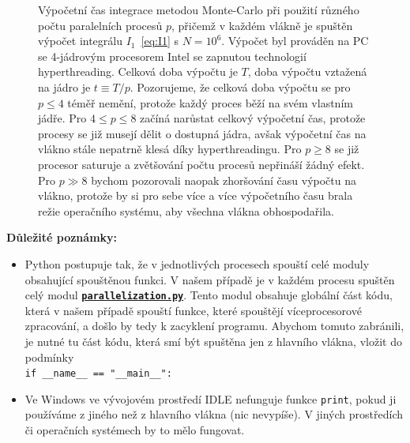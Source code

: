 \documentclass[a4paper,11pt,twoside]{article}
\def\code#1{\textnormal{\texttt{#1}}}
\def\ghfile#1#2{\textnormal{\textbf{\texttt{\href{https://github.com/PavelStransky/PCInPhysics/blob/main/#1#2}{#2}}}}}
\theoremstyle{red}
\theoremstyle{green}
\begin{document}
    \begin{figure}[!htb]
        \begin{subfigure}{0.49\linewidth}
            \centering{}
            \caption{}
        \end{subfigure}
        \hfill
        \begin{subfigure}{0.49\linewidth}
            \centering{}
            \caption{}
        \end{subfigure}
        \caption{
            \protect\small
            Výpočetní čas integrace metodou Monte-Carlo při použití různého počtu paralelních procesů $p$, přičemž v každém vlákně je spuštěn výpočet integrálu $I_{1}$~\eqref{eq:I1} s $N=10^{6}$.
            Výpočet byl prováděn na PC se 4-jádrovým procesorem Intel se zapnutou technologií hyperthreading.
            Celková doba výpočtu je $T$, doba výpočtu vztažená na jádro je $t\equiv T/p$.
            Pozorujeme, že celková doba výpočtu se pro $p\leq4$ téměř nemění, protože každý proces běží na svém vlastním jádře.
            Pro $4\leq p\leq8$ začíná narůstat celkový výpočetní čas, protože procesy se již musejí dělit o dostupná jádra, avšak výpočetní čas na vlákno stále nepatrně klesá díky hyperthreadingu.
            Pro $p\geq8$ se již procesor saturuje a zvětšování počtu procesů nepřináší žádný efekt.
            Pro $p\gg8$ bychom pozorovali naopak zhoršování času výpočtu na vlákno, protože by si pro sebe více a více výpočetního času brala režie operačního systému, aby všechna vlákna obhospodařila.
        }
        \label{fig:Duration}
    \end{figure}

    {\bf Důležité poznámky:}
    \begin{itemize}
        \item
            Python postupuje tak, že v jednotlivých procesech spouští celé moduly obsahující spouštěnou funkci.
            V našem případě je v každém procesu spuštěn celý modul \ghfile{python/montecarlo/}{parallelization.py}.
            Tento modul obsahuje globální část kódu, která v našem případě spouští funkce, které spouštějí víceprocesorové zpracování, a došlo by tedy k zacyklení programu.
            Abychom tomuto zabránili, je nutné tu část kódu, která smí být spuštěna jen z hlavního vlákna, vložit do podmínky\\
            \code{if \_\_name\_\_ == "\_\_main\_\_":}

        \item
            Ve Windows ve vývojovém prostředí IDLE nefunguje funkce \code{print}, pokud ji používáme z jiného než z hlavního vlákna (nic nevypíše).
            V jiných prostředích či operačních systémech by to mělo fungovat.
    \end{itemize}
\end{document}
